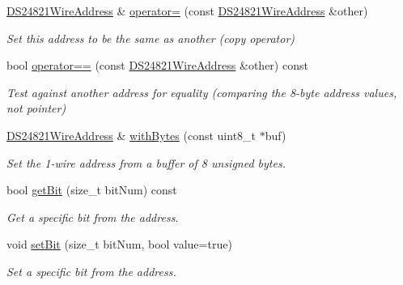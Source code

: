 \begin{DoxyCompactItemize}
\mbox{\label{class_d_s24821_wire_address_acb28efccf08e932eefb39012c6b628e3}} 
\mbox{\hyperlink{class_d_s24821_wire_address}{D\+S24821\+Wire\+Address}} \& \mbox{\hyperlink{class_d_s24821_wire_address_acb28efccf08e932eefb39012c6b628e3}{operator=}} (const \mbox{\hyperlink{class_d_s24821_wire_address}{D\+S24821\+Wire\+Address}} \&other)
\begin{DoxyCompactList}\small\item\em Set this address to be the same as another (copy operator) \end{DoxyCompactList}\item 
\mbox{\label{class_d_s24821_wire_address_a87e420002b42405b2ac1865ffc12638a}} 
bool \mbox{\hyperlink{class_d_s24821_wire_address_a87e420002b42405b2ac1865ffc12638a}{operator==}} (const \mbox{\hyperlink{class_d_s24821_wire_address}{D\+S24821\+Wire\+Address}} \&other) const
\begin{DoxyCompactList}\small\item\em Test against another address for equality (comparing the 8-\/byte address values, not pointer) \end{DoxyCompactList}\item 
\mbox{\label{class_d_s24821_wire_address_a7be80a72fd834ed023e3ce13d167b80d}} 
\mbox{\hyperlink{class_d_s24821_wire_address}{D\+S24821\+Wire\+Address}} \& \mbox{\hyperlink{class_d_s24821_wire_address_a7be80a72fd834ed023e3ce13d167b80d}{with\+Bytes}} (const uint8\+\_\+t $\ast$buf)
\begin{DoxyCompactList}\small\item\em Set the 1-\/wire address from a buffer of 8 unsigned bytes. \end{DoxyCompactList}\item 
bool \mbox{\hyperlink{class_d_s24821_wire_address_ae4cb62921b014f1d886ad032329a5b1f}{get\+Bit}} (size\+\_\+t bit\+Num) const
\begin{DoxyCompactList}\small\item\em Get a specific bit from the address. \end{DoxyCompactList}\item 
void \mbox{\hyperlink{class_d_s24821_wire_address_a04139e9c1fb6a2e001c3e1ab1db99cf4}{set\+Bit}} (size\+\_\+t bit\+Num, bool value=true)
\begin{DoxyCompactList}\small\item\em Set a specific bit from the address. \end{DoxyCompactList}\item 

\end{DoxyCompactItemize}
